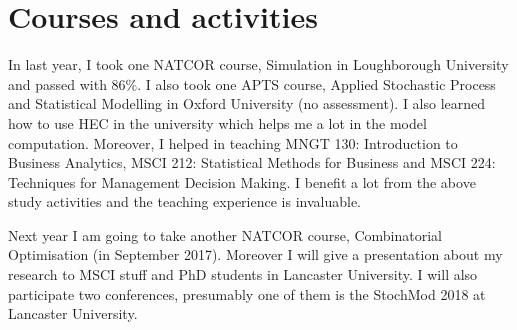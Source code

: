\documentclass[12pt]{article}
\begin{document}
\section{Courses and activities}
In last year, I took one NATCOR course, Simulation in Loughborough University and passed with $86\%$. I also took one APTS course, Applied Stochastic Process and Statistical Modelling in Oxford University (no assessment). I also learned how to use HEC in the university which helps me a lot in the model computation. Moreover, I helped in teaching MNGT 130: Introduction to Business Analytics, MSCI 212: Statistical Methods for Business and MSCI 224: Techniques for Management Decision Making. I benefit a lot from the above study activities and the teaching experience is invaluable.

Next year I am going to take another NATCOR course, Combinatorial Optimisation (in September 2017). Moreover I will give a presentation about my research to MSCI stuff and PhD students in Lancaster University. I will also participate two conferences, presumably one of them is the StochMod 2018 at Lancaster University.



\newpage


\end{document}
